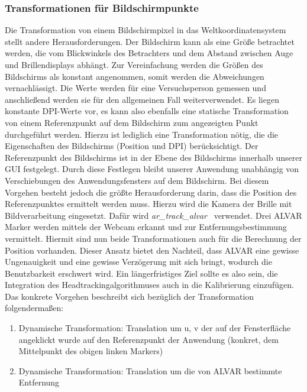 \subsubsection*{Transformationen für Bildschirmpunkte}
\label{ssection:alva}
Die Transformation von einem Bildschirmpixel in das Weltkoordinatensystem stellt andere Herausforderungen. 
Der Bildschirm kann als eine Größe betrachtet werden, die vom Blickwinkels des Betrachters und dem Abstand zwischen Auge und Brillendisplays abhängt. Zur Vereinfachung werden die Größen des Bildschirms als konstant angenommen, somit werden die Abweichungen vernachlässigt. Die Werte werden für eine Versuchsperson gemessen und anschließend werden sie für den allgemeinen Fall weiterverwendet.
Es liegen konstante  \ac{DPI}-Werte vor, es kann also ebenfalls eine statische Transformation von einem Referenzpunkt auf dem Bildschirm zum angezeigten Punkt durchgeführt werden. 
Hierzu ist lediglich eine Transformation nötig, die die Eigenschaften des Bildschirms (Position und DPI) berücksichtigt. 
Der Referenzpunkt des Bildschirms ist in der Ebene des Bildschirms innerhalb unserer GUI festgelegt. Durch diese Festlegen bleibt unserer Anwendung unabhängig von Verschiebungen des Anwendungsfensters auf dem Bildschirm. 
Bei diesem Vorgehen besteht jedoch die größte Herausforderung darin, dass die Position des Referenzpunktes ermittelt werden muss. 
Hierzu wird die Kamera der Brille mit Bildverarbeitung eingesetzt. 
Dafür wird \emph{ar\_track\_alvar}~\cite{ros_ar_track_alvar} verwendet.
Drei ALVAR Marker werden mittels der Webcam erkannt und zur Entfernungsbestimmung vermittelt. 
Hiermit sind nun beide Transformationen auch für die Berechnung der Position vorhanden. 
Dieser Ansatz bietet den Nachteil, dass ALVAR eine gewisse Ungenauigkeit und eine gewisse Verzögerung mit sich bringt, wodurch die Benutzbarkeit erschwert wird. 
Ein längerfristiges Ziel sollte es also sein, die Integration des Headtrackingalgorithmuses auch in die Kalibrierung einzufügen.
Das konkrete Vorgehen beschreibt sich bezüglich der Transformation folgendermaßen:

   \begin{enumerate}
      \item Dynamische Transformation:  Translation  um u, v der auf der Fensterfläche angeklickt wurde auf den Referenzpunkt der Anwendung (konkret, dem Mittelpunkt des obigen linken Markers) 
      \item Dynamische Transformation: Translation um die von ALVAR bestimmte Entfernung
   \end{enumerate}


